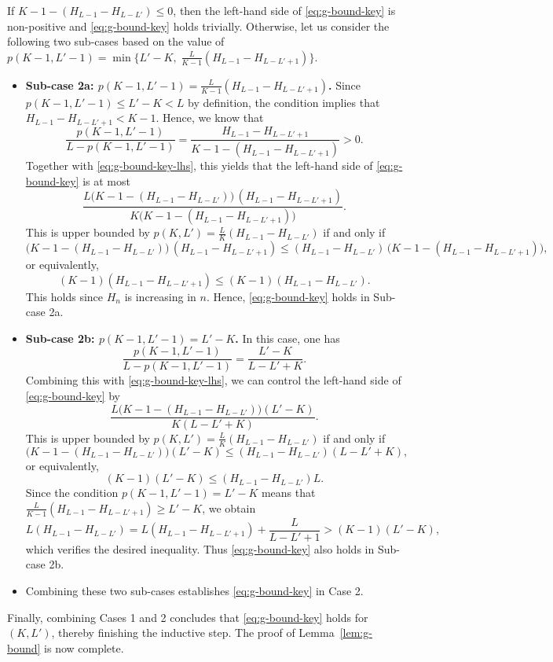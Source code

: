 \documentclass[english]{article}
\begin{document}
If $K - 1 - (H_{L-1} - H_{L-L'})\leq 0$, then the left-hand side of \eqref{eq:g-bound-key} is non-positive and \eqref{eq:g-bound-key} holds trivially. Otherwise, let us consider the following two sub-cases based on the value of $p(K-1,L'-1) = \min\big\{L'-K,\; \frac{L}{K-1}(H_{L-1} - H_{L-L'+1})\big\}$.
\begin{itemize}
    \item 
\textbf{Sub-case 2a: $p(K-1, L'-1) = \frac{L}{K-1}(H_{L-1} - H_{L-L'+1})$.}
Since $p(K-1, L'-1) \leq L'-K < L$ by definition, the condition implies that $H_{L-1} - H_{L-L'+1} < K - 1$. Hence, we know that
\[
    \frac{p(K-1, L'-1)}{L - p(K-1, L'-1)} = \frac{H_{L-1} - H_{L-L'+1}}{K - 1 - (H_{L-1} - H_{L-L'+1})} > 0.
\]
Together with \eqref{eq:g-bound-key-lhs}, this yields that the left-hand side of \eqref{eq:g-bound-key} is at most
\[
    \frac{L\big(K - 1 - (H_{L-1} - H_{L-L'})\big)\,(H_{L-1} - H_{L-L'+1})}{K\big(K - 1 - (H_{L-1} - H_{L-L'+1})\big)}.
\]
This is upper bounded by $p(K, L') = \frac{L}{K}(H_{L-1} - H_{L-L'})$ if and only if
\[
    \big(K - 1 - (H_{L-1} - H_{L-L'})\big)\,(H_{L-1} - H_{L-L'+1}) \leq (H_{L-1} - H_{L-L'})\,\big(K - 1 - (H_{L-1} - H_{L-L'+1})\big),
\]
or equivalently,
\[
    (K-1)(H_{L-1} - H_{L-L'+1}) \leq (K-1)(H_{L-1} - H_{L-L'}).
\]
This holds since $H_{n}$ is increasing in $n$. Hence, \eqref{eq:g-bound-key} holds in Sub-case 2a.

\item\textbf{Sub-case 2b: $p(K-1, L'-1) = L'-K$.}
In this case, one has $$\frac{p(K-1, L'-1)}{L-p(K-1, L'-1)} = \frac{L'-K}{L-L'+K}.$$ Combining this with \eqref{eq:g-bound-key-lhs}, we can control the left-hand side of \eqref{eq:g-bound-key} by
\[
    \frac{L\big(K -1 - (H_{L-1} - H_{L-L'})\big)(L'-K)}{K(L-L'+K)}.
\]
This is upper bounded by $p(K, L') = \frac{L}{K}(H_{L-1} - H_{L-L'})$ if and only if
\[
    \big(K -1 - (H_{L-1} - H_{L-L'}) \big)(L'-K) \leq (H_{L-1} - H_{L-L'})(L-L'+K),
\]
or equivalently,
$$(K-1)(L'-K) \leq (H_{L-1} - H_{L-L'})L.$$ 
Since the condition $p(K-1, L'-1) = L'-K$ means that $\frac{L}{K-1}(H_{L-1} - H_{L-L'+1}) \geq L'-K$, we obtain
\[
    L(H_{L-1} - H_{L-L'}) = L(H_{L-1} - H_{L-L'+1}) + \frac{L}{L-L'+1} > (K-1)(L'-K),
\]
which verifies the desired inequality.
Thus \eqref{eq:g-bound-key} also holds in Sub-case 2b.

\item Combining these two sub-cases establishes \eqref{eq:g-bound-key} in Case 2.
\end{itemize}

Finally, combining Cases 1 and 2 concludes that \eqref{eq:g-bound-key} holds for $(K, L')$, thereby finishing the inductive step. The proof of Lemma~\ref{lem:g-bound} is now complete.
\end{document}
